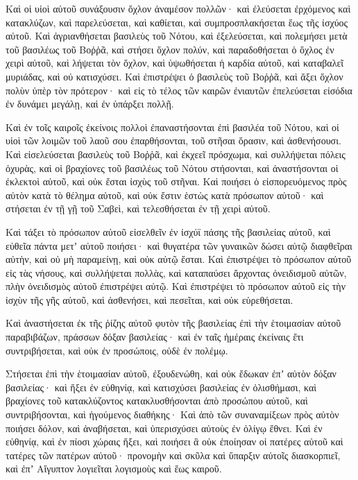 {\par }{\PP {}Καὶ οἱ υἱοὶ αὐτοῦ συνάξουσιν ὄχλον ἀναμέσον πολλῶν· καὶ ἐλεύσεται ἐρχόμενος καὶ κατακλύζων, καὶ παρελεύσεται, καὶ καθίεται, καὶ συμπροσπλακήσεται ἕως τῆς ἰσχύος αὐτοῦ.
Καὶ ἀγριανθήσεται βασιλεὺς τοῦ Νότου, καὶ ἐξελεύσεται, καὶ πολεμήσει μετὰ τοῦ βασιλέως τοῦ Βοῤῥᾶ, καὶ στήσει ὄχλον πολύν, καὶ παραδοθήσεται ὁ ὄχλος ἐν χειρὶ αὐτοῦ,
καὶ λήψεται τὸν ὄχλον, καὶ ὑψωθήσεται ἡ καρδία αὐτοῦ, καὶ καταβαλεῖ μυριάδας, καὶ οὐ κατισχύσει.
Καὶ ἐπιστρέψει ὁ βασιλεὺς τοῦ Βοῤῥᾶ, καὶ ἄξει ὄχλον πολὺν ὑπὲρ τὸν πρότερον· καὶ εἰς τὸ τέλος τῶν καιρῶν ἐνιαυτῶν ἐπελεύσεται εἰσόδια ἐν δυνάμει μεγάλῃ, καὶ ἐν ὑπάρξει πολλῇ.
\par }{\PP {}Καὶ ἐν τοῖς καιροῖς ἐκείνοις πολλοὶ ἐπαναστήσονται ἐπὶ βασιλέα τοῦ Νότου, καὶ οἱ υἱοὶ τῶν λοιμῶν τοῦ λαοῦ σου ἐπαρθήσονται, τοῦ στῆσαι ὅρασιν, καὶ ἀσθενήσουσι.
Καὶ εἰσελεύσεται βασιλεὺς τοῦ Βοῤῥᾶ, καὶ ἐκχεεῖ πρόσχωμα, καὶ συλλήψεται πόλεις ὀχυρὰς, καὶ οἱ βραχίονες τοῦ βασιλέως τοῦ Νότου στήσονται, καὶ ἀναστήσονται οἱ ἐκλεκτοὶ αὐτοῦ, καὶ οὐκ ἔσται ἰσχὺς τοῦ στῆναι.
Καὶ ποιήσει ὁ εἰσπορευόμενος πρὸς αὐτὸν κατὰ τὸ θέλημα αὐτοῦ, καὶ οὐκ ἔστιν ἑστὼς κατὰ πρόσωπον αὐτοῦ· καὶ στήσεται ἐν τῇ γῇ τοῦ Σαβεὶ, καὶ τελεσθήσεται ἐν τῇ χειρὶ αὐτοῦ.
\par }{\PP {}Καὶ τάξει τὸ πρόσωπον αὐτοῦ εἰσελθεῖν ἐν ἰσχύϊ πάσης τῆς βασιλείας αὐτοῦ, καὶ εὐθεῖα πάντα μετʼ αὐτοῦ ποιήσει· καὶ θυγατέρα τῶν γυναικῶν δώσει αὐτῷ διαφθεῖραι αὐτὴν, καὶ οὐ μὴ παραμείνῃ, καὶ οὐκ αὐτῷ ἔσται.
Καὶ ἐπιστρέψει τὸ πρόσωπον αὐτοῦ εἰς τὰς νήσους, καὶ συλλήψεται πολλὰς, καὶ καταπαύσει ἄρχοντας ὀνειδισμοῦ αὐτῶν, πλὴν ὀνειδισμὸς αὐτοῦ ἐπιστρέψει αὐτῷ.
Καὶ ἐπιστρέψει τὸ πρόσωπον αὐτοῦ εἰς τὴν ἰσχὺν τῆς γῆς αὐτοῦ, καὶ ἀσθενήσει, καὶ πεσεῖται, καὶ οὐκ εὑρεθήσεται.
\par }{\PP {}Καὶ ἀναστήσεται ἐκ τῆς ῥίζης αὐτοῦ φυτὸν τῆς βασιλείας ἐπὶ τὴν ἑτοιμασίαν αὐτοῦ παραβιβάζων, πράσσων δόξαν βασιλείας· καὶ ἐν ταῖς ἡμέραις ἐκείναις ἔτι συντριβήσεται, καὶ οὐκ ἐν προσώποις, οὐδὲ ἐν πολέμῳ.
\par }{\PP {}Στήσεται ἐπὶ τὴν ἑτοιμασίαν αὐτοῦ, ἐξουδενώθη, καὶ οὐκ ἔδωκαν ἐπʼ αὐτὸν δόξαν βασιλείας· καὶ ἥξει ἐν εὐθηνίᾳ, καὶ κατισχύσει βασιλείας ἐν ὀλισθήμασι,
καὶ βραχίονες τοῦ κατακλύζοντος κατακλυσθήσονται ἀπὸ προσώπου αὐτοῦ, καὶ συντριβήσονται, καὶ ἡγούμενος διαθήκης·
Καὶ ἀπὸ τῶν συναναμίξεων πρὸς αὐτὸν ποιήσει δόλον, καὶ ἀναβήσεται, καὶ ὑπερισχύσει αὐτοὺς ἐν ὀλίγῳ ἔθνει.
Καὶ ἐν εὐθηνίᾳ, καὶ ἐν πίοσι χώραις ἥξει, καὶ ποιήσει ἃ οὐκ ἐποίησαν οἱ πατέρες αὐτοῦ καὶ τατέρες τῶν πατέρων αὐτοῦ· προνομὴν καὶ σκῦλα καὶ ὕπαρξιν αὐτοῖς διασκορπιεῖ, καὶ ἐπʼ Αἴγυπτον λογιεῖται λογισμοὺς καὶ ἕως καιροῦ.
}
